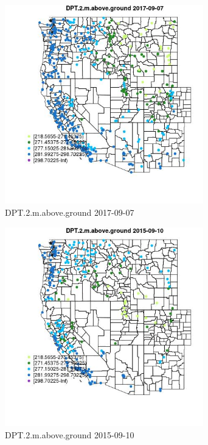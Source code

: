 \begin{figure} 
\centering  
\includegraphics[width=0.77\textwidth]{Code_Outputs/Report_ML_input_PM25_Step4_part_e_de_duplicated_aves_compiled_2019-05-20wNAs_MapObsDPT2maboveground2017-09-07.jpg} 
\caption{\label{fig:Report_ML_input_PM25_Step4_part_e_de_duplicated_aves_compiled_2019-05-20wNAsMapObsDPT2maboveground2017-09-07}DPT.2.m.above.ground 2017-09-07} 
\end{figure} 
 

\begin{figure} 
\centering  
\includegraphics[width=0.77\textwidth]{Code_Outputs/Report_ML_input_PM25_Step4_part_e_de_duplicated_aves_compiled_2019-05-20wNAs_MapObsDPT2maboveground2015-09-10.jpg} 
\caption{\label{fig:Report_ML_input_PM25_Step4_part_e_de_duplicated_aves_compiled_2019-05-20wNAsMapObsDPT2maboveground2015-09-10}DPT.2.m.above.ground 2015-09-10} 
\end{figure} 
 

